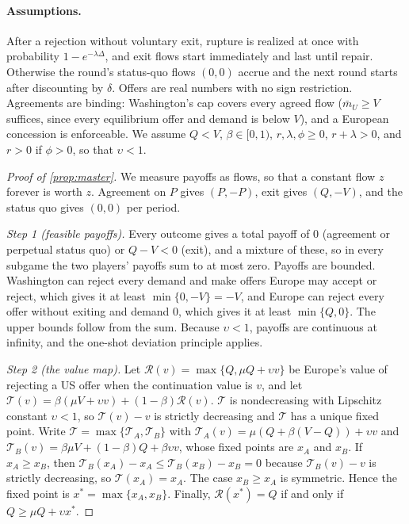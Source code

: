 \paragraph{Assumptions.} After a rejection without voluntary exit, rupture is realized at once with probability $1-e^{-\lambda\Delta}$, and exit flows start immediately and last until repair. Otherwise the round's status-quo flows $(0,0)$ accrue and the next round starts after discounting by $\delta$. Offers are real numbers with no sign restriction. Agreements are binding: Washington's cap covers every agreed flow ($\bar m_U\ge V$ suffices, since every equilibrium offer and demand is below $V$), and a European concession is enforceable. We assume $Q<V$, $\beta\in[0,1)$, $r,\lambda,\phi\ge 0$, $r+\lambda>0$, and $r>0$ if $\phi>0$, so that $\upsilon<1$.

\begin{proof}[Proof of \cref{prop:master}]
We measure payoffs as flows, so that a constant flow $z$ forever is worth $z$. Agreement on $P$ gives $(P,-P)$, exit gives $(Q,-V)$, and the status quo gives $(0,0)$ per period.

\emph{Step 1 (feasible payoffs).} Every outcome gives a total payoff of $0$ (agreement or perpetual status quo) or $Q-V<0$ (exit), and a mixture of these, so in every subgame the two players' payoffs sum to at most zero. Payoffs are bounded. Washington can reject every demand and make offers Europe may accept or reject, which gives it at least $\min\{0,-V\}=-V$, and Europe can reject every offer without exiting and demand $0$, which gives it at least $\min\{Q,0\}$. The upper bounds follow from the sum. Because $\upsilon<1$, payoffs are continuous at infinity, and the one-shot deviation principle applies.

\emph{Step 2 (the value map).} Let $\mathcal R(v)=\max\{Q,\mu Q+\upsilon v\}$ be Europe's value of rejecting a US offer when the continuation value is $v$, and let $\mathcal T(v)=\beta(\mu V+\upsilon v)+(1-\beta)\mathcal R(v)$. $\mathcal T$ is nondecreasing with Lipschitz constant $\upsilon<1$, so $\mathcal T(v)-v$ is strictly decreasing and $\mathcal T$ has a unique fixed point. Write $\mathcal T=\max\{\mathcal T_A,\mathcal T_B\}$ with $\mathcal T_A(v)=\mu(Q+\beta(V-Q))+\upsilon v$ and $\mathcal T_B(v)=\beta\mu V+(1-\beta)Q+\beta\upsilon v$, whose fixed points are $x_A$ and $x_B$. If $x_A\ge x_B$, then $\mathcal T_B(x_A)-x_A\le\mathcal T_B(x_B)-x_B=0$ because $\mathcal T_B(v)-v$ is strictly decreasing, so $\mathcal T(x_A)=x_A$. The case $x_B\ge x_A$ is symmetric. Hence the fixed point is $x^*=\max\{x_A,x_B\}$. Finally, $\mathcal R(x^*)=Q$ if and only if $Q\ge\mu Q+\upsilon x^*$.


\end{proof}
